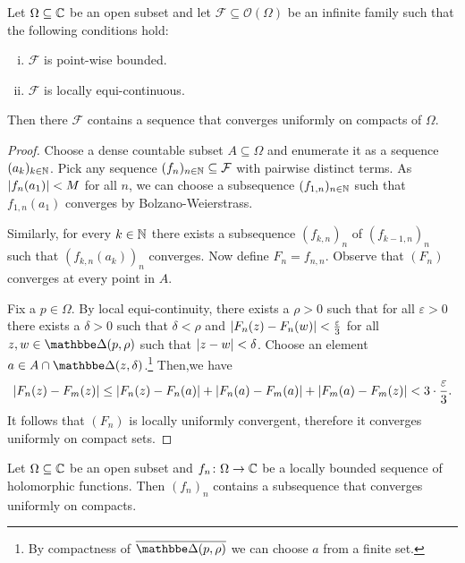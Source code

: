 \begin{izrek}
Let $\Omega \subseteq \mathbb{C}$ be an open subset and let
$\mathcal{F} \subseteq \mathcal{O}(\Omega)$ be an infinite family
such that the following conditions hold:

\begin{enumerate}[i)]
\item $\mathcal{F}$ is point-wise bounded.
\item $\mathcal{F}$ is locally equi-continuous.
\end{enumerate}

Then there $\mathcal{F}$ contains a sequence that converges
uniformly on compacts of $\Omega$.
\end{izrek}

\begin{proof}
Choose a dense countable subset $A \subseteq \Omega$ and enumerate
it as a sequence $(a_k)_{k \in \mathbb{N}}$. Pick any sequence
$(f_n)_{n \in \mathbb{N}} \subseteq \mathcal{F}$ with pairwise distinct
terms. As $\left\lvert f_n(a_1)\right\rvert < M$ for all $n$, we can choose a
subsequence $(f_{1,n})_{n \in \mathbb{N}}$ such that $f_{1,n}(a_1)$
converges by Bolzano-Weierstrass.

Similarly, for every $k \in \mathbb{N}$ there exists a subsequence
$(f_{k,n})_{n}$ of $(f_{k-1,n})_n$ such that $(f_{k,n}(a_k))_n$
converges. Now define $F_n = f_{n,n}$. Observe that $(F_n)$
converges at every point in $A$.

Fix a $p \in \Omega$. By local equi-continuity, there exists a
$\rho > 0$ such that for all $\varepsilon > 0$ there exists a
$\delta > 0$ such that $\delta < \rho$ and
$\left\lvert F_n(z) - F_n(w)\right\rvert < \frac{\varepsilon}{3}$ for all
$z, w \in \dsk(p, \rho)$ such that $\left\lvert z-w\right\rvert < \delta$. Choose an
element $a \in A \cap \dsk(z, \delta)$.\footnote{By compactness of
$\oline{\dsk(p, \rho)}$ we can choose $a$ from a finite set.} Then,we have
\[
\left\lvert F_n(z) - F_m(z)\right\rvert \leq
\left\lvert F_n(z) - F_n(a)\right\rvert +
\left\lvert F_n(a) - F_m(a)\right\rvert +
\left\lvert F_m(a) - F_m(z)\right\rvert <
3 \cdot \frac{\varepsilon}{3}.
\]
It follows that $(F_n)$ is locally uniformly convergent, therefore
it converges uniformly on compact sets.
\end{proof}

\begin{izrek}[Montel]
Let $\Omega \subseteq \mathbb{C}$ be an open subset and
$f_n \colon \Omega \to \mathbb{C}$ be a locally bounded sequence of
holomorphic functions. Then $(f_n)_n$ contains a subsequence that
converges uniformly on compacts.
\end{izrek}

